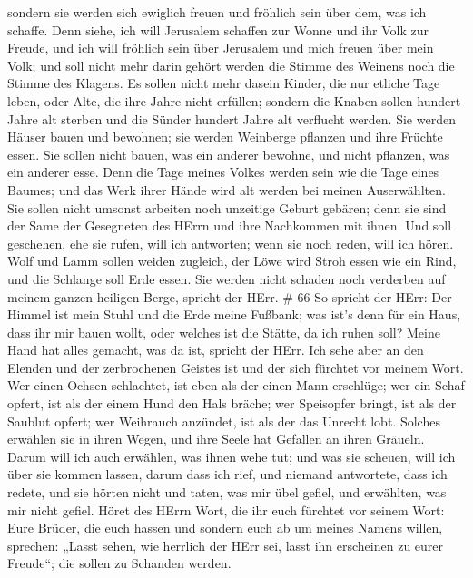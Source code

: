  sondern sie werden sich ewiglich freuen und fröhlich sein
über dem, was ich schaffe. Denn siehe, ich will Jerusalem schaffen zur
Wonne und ihr Volk zur Freude,  und ich will fröhlich sein
über Jerusalem und mich freuen über mein Volk; und soll nicht mehr darin
gehört werden die Stimme des Weinens noch die Stimme des Klagens.
 Es sollen nicht mehr dasein Kinder, die nur etliche Tage
leben, oder Alte, die ihre Jahre nicht erfüllen; sondern die Knaben
sollen hundert Jahre alt sterben und die Sünder hundert Jahre alt
verflucht werden.  Sie werden Häuser bauen und bewohnen;
sie werden Weinberge pflanzen und ihre Früchte essen.  Sie
sollen nicht bauen, was ein anderer bewohne, und nicht pflanzen, was ein
anderer esse. Denn die Tage meines Volkes werden sein wie die Tage eines
Baumes; und das Werk ihrer Hände wird alt werden bei meinen
Auserwählten.  Sie sollen nicht umsonst arbeiten noch
unzeitige Geburt gebären; denn sie sind der Same der Gesegneten des
HErrn und ihre Nachkommen mit ihnen.  Und soll geschehen,
ehe sie rufen, will ich antworten; wenn sie noch reden, will ich hören.
 Wolf und Lamm sollen weiden zugleich, der Löwe wird Stroh
essen wie ein Rind, und die Schlange soll Erde essen. Sie werden nicht
schaden noch verderben auf meinem ganzen heiligen Berge, spricht der
HErr. \# 66  So spricht der HErr: Der Himmel ist mein Stuhl
und die Erde meine Fußbank; was ist's denn für ein Haus, dass ihr mir
bauen wollt, oder welches ist die Stätte, da ich ruhen soll?
 Meine Hand hat alles gemacht, was da ist, spricht der HErr.
Ich sehe aber an den Elenden und der zerbrochenen Geistes ist und der
sich fürchtet vor meinem Wort.  Wer einen Ochsen schlachtet,
ist eben als der einen Mann erschlüge; wer ein Schaf opfert, ist als der
einem Hund den Hals bräche; wer Speisopfer bringt, ist als der Saublut
opfert; wer Weihrauch anzündet, ist als der das Unrecht lobt. Solches
erwählen sie in ihren Wegen, und ihre Seele hat Gefallen an ihren
Gräueln.  Darum will ich auch erwählen, was ihnen wehe tut;
und was sie scheuen, will ich über sie kommen lassen, darum dass ich
rief, und niemand antwortete, dass ich redete, und sie hörten nicht und
taten, was mir übel gefiel, und erwählten, was mir nicht gefiel.
 Höret des HErrn Wort, die ihr euch fürchtet vor seinem
Wort: Eure Brüder, die euch hassen und sondern euch ab um meines Namens
willen, sprechen: „Lasst sehen, wie herrlich der HErr sei, lasst ihn
erscheinen zu eurer Freude``; die sollen zu Schanden werden.
